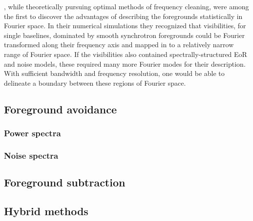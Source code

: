\cite{Wang.06}, while theoretically pursuing optimal methods of frequency cleaning, were among the first to discover the advantages of describing the foregrounds statistically in Fourier space. In their numerical simulations they recognized that visibilities, for single baselines, dominated by smooth synchrotron foregrounds could be Fourier transformed along their frequency axis and mapped in to a relatively narrow range of Fourier space. If the visibilities also contained spectrally-structured EoR and noise models, these required many more Fourier modes for their description. With sufficient bandwidth and frequency resolution, one would be able to delineate a boundary between these regions of Fourier space.



\subsection{Foreground avoidance}
\subsubsection{Power spectra}
\subsubsection{Noise spectra}

\subsection{Foreground subtraction}

\subsection{Hybrid methods}

